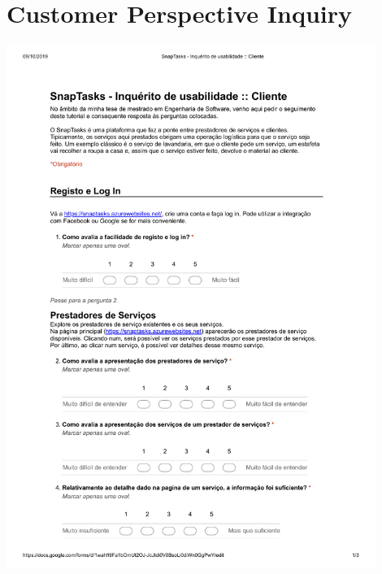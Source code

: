\chapter{Customer Perspective Inquiry} %

\label{AppendixD} 

 \includegraphics[page=1,origin=c, width=0.9\textwidth ]{appendices/files/inquiry-customer.pdf}

\pagebreak

